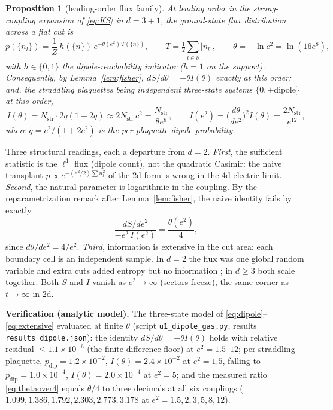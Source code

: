 \documentclass[11pt]{article}
\newtheorem{proposition}[theorem]{Proposition}
\theoremstyle{remark}
\theoremstyle{plain}
\begin{document}
\begin{proposition}[leading-order flux family]\label{prop:dipole}
At leading order in the strong-coupling expansion of \eqref{eq:KS} in $d = 3{+}1$, the ground-state flux distribution across a flat cut is
\begin{equation}\label{eq:dipole}
p(\{n_l\}) = \frac{1}{Z}\, h(\{n\})\, e^{-\theta(e^2)\, T(\{n\})}, \qquad
T = \tfrac12 \sum_{l \in \partial} |n_l|, \qquad
\theta = -\ln c^2 = \ln(16 e^8),
\end{equation}
with $h \in \{0,1\}$ the dipole-reachability indicator ($h = 1$ on the support). Consequently, by Lemma~\ref{lem:fisher}, $dS/d\theta = -\theta I(\theta)$ exactly at this order; and, the straddling plaquettes being independent three-state systems $\{0, \pm\text{dipole}\}$ at this order,
\begin{equation}\label{eq:extensive}
I(\theta) = N_{\mathrm{str}} \cdot 2q(1 - 2q) \approx 2 N_{\mathrm{str}}\, c^2 = \frac{N_{\mathrm{str}}}{8 e^8},
\qquad
I(e^2) = \Big(\frac{d\theta}{de^2}\Big)^{2} I(\theta) = \frac{2 N_{\mathrm{str}}}{e^{12}},
\end{equation}
where $q = c^2/(1 + 2c^2)$ is the per-plaquette dipole probability.
\end{proposition}

Three structural readings, each a departure from $d = 2$. \emph{First}, the sufficient statistic is the $\ell^1$ flux (dipole count), not the quadratic Casimir: the naive transplant $p \propto e^{-(e^2/2)\sum n_l^2}$ of the 2d form is wrong in the 4d electric limit. \emph{Second}, the natural parameter is logarithmic in the coupling. By the reparametrization remark after Lemma~\ref{lem:fisher}, the naive identity fails by exactly
\begin{equation}\label{eq:thetaover4}
\frac{dS/de^2}{-e^2\, I(e^2)} = \frac{\theta(e^2)}{4},
\end{equation}
since $d\theta/de^2 = 4/e^2$. \emph{Third}, information is extensive in the cut area: each boundary cell is an independent sample. In $d = 2$ the flux was one global random variable and extra cuts added entropy but no information \cite{P3}; in $d \geq 3$ both scale together. Both $S$ and $I$ vanish as $e^2 \to \infty$ (sectors freeze), the same corner as $t \to \infty$ in 2d.

\textbf{Verification (analytic model).} The three-state model of \eqref{eq:dipole}--\eqref{eq:extensive} evaluated at finite $\theta$ (script \texttt{u1\_dipole\_gas.py}, results \texttt{results\_dipole.json}): the identity $dS/d\theta = -\theta I(\theta)$ holds with relative residual $\leq 1.1\times10^{-6}$ (the finite-difference floor) at $e^2 = 1.5$--$12$; per straddling plaquette, $p_{\mathrm{dip}} = 1.2\times10^{-2}$, $I(\theta) = 2.4\times10^{-2}$ at $e^2 = 1.5$, falling to $p_{\mathrm{dip}} = 1.0\times10^{-4}$, $I(\theta) = 2.0\times10^{-4}$ at $e^2 = 5$; and the measured ratio \eqref{eq:thetaover4} equals $\theta/4$ to three decimals at all six couplings ($1.099, 1.386, 1.792, 2.303, 2.773, 3.178$ at $e^2 = 1.5, 2, 3, 5, 8, 12$).
\end{document}

